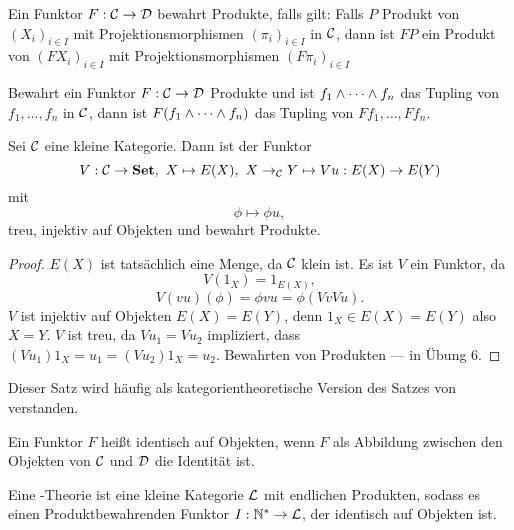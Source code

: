\documentclass{book}
\begin{document}
\begin{definition}
    Ein Funktor $F:\mathcal{C}\rightarrow \mathcal{D}$ bewahrt Produkte, falls gilt:
    Falls $P$ Produkt von ${(X_i)}_{i\in I}$ mit Projektionsmorphismen ${(\pi_i)}_{i\in I}$ in $\mathcal{C}$, dann ist $FP$ ein Produkt von ${(FX_i)}_{i\in I}$ mit Projektionsmorphismen ${(F\pi_i)}_{i\in I}$
\end{definition}

\begin{remark}
    Bewahrt ein Funktor $F:\mathcal{C}\rightarrow\mathcal{D}$ Produkte und ist $f_1\wedge \cdots \wedge f_n$ das Tupling von $f_1,\ldots,f_n$ in $\mathcal{C}$, dann ist $F(f_1\wedge\cdots\wedge f_n)$ das Tupling von $Ff_1, \ldots, Ff_n$.
\end{remark}

\begin{theorem}
    Sei $\mathcal{C}$ eine kleine Kategorie. Dann ist der Funktor
    $$
    V : \mathcal{C} \rightarrow \mathbf{Set},\ X \mapsto E(X),\ X\rightarrow_{\mathcal{C}} Y \mapsto Vu : E(X)\rightarrow E(Y)
    $$
    mit
    $$
    \phi\mapsto \phi u,
    $$
    treu, injektiv auf Objekten und bewahrt Produkte.    
\end{theorem}

\begin{proof}
    $E(X)$ ist tatsächlich eine Menge, da $\mathcal{C}$ klein ist. Es ist $V$ ein Funktor, da
    $$
    V(1_X)=1_{E(X)},
    $$
    $$
    V(vu)(\phi)=\phi v u = \phi(Vv Vu).
    $$
    $V$ ist injektiv auf Objekten $E(X)=E(Y)$, denn $1_X\in E(X)=E(Y)$ also $X = Y$.
    $V$ ist treu, da $Vu_1=Vu_2$ impliziert, dass $(Vu_1)1_X=u_1=(Vu_2)1_X=u_2$.
    Bewahrten von Produkten --- in Übung 6.
\end{proof}

\begin{remark}
    Dieser Satz wird häufig als kategorientheoretische Version des Satzes von  verstanden.
\end{remark}

\begin{definition}
    Ein Funktor $F$ heißt identisch auf Objekten, wenn $F$ als Abbildung zwischen den Objekten von $\mathcal{C}$ und $\mathcal{D}$ die Identität ist. 
\end{definition}

\begin{definition}
    Eine -Theorie ist eine kleine Kategorie $\mathcal{L}$ mit endlichen Produkten, sodass es einen Produktbewahrenden Funktor $I:\mathbb{N}^{\ast} \rightarrow \mathcal{L}$, der identisch auf Objekten ist.
\end{definition}
\end{document}
